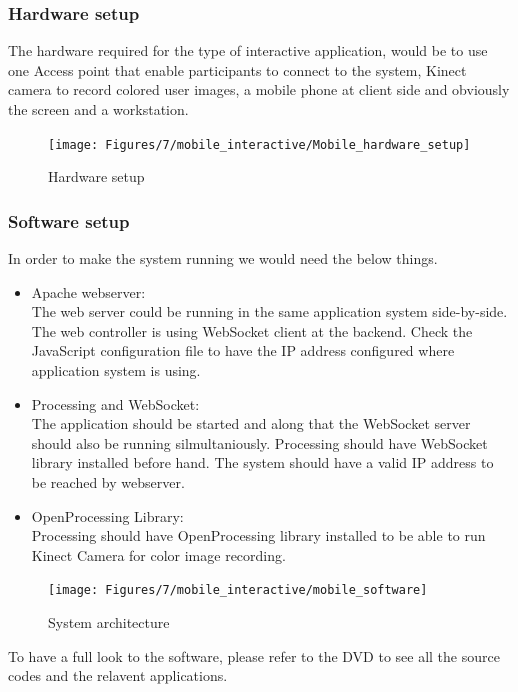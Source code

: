 \iffalse

\subsubsection{Hardware setup}
The hardware required for the type of interactive application, would be to use one Access point that enable participants to connect to the system, Kinect camera to record colored user images, a mobile phone at client side and obviously the screen and a workstation.


\begin{figure}[H]
    \centering
    \texttt{[image: Figures/7/mobile\_interactive/Mobile\_hardware\_setup]}
    \caption{Hardware setup}%
    \label{fig:mobile_hardware_setup}%
\end{figure}


\subsubsection{Software setup}
In order to make the system running we would need the below things.
\begin{itemize}
\item Apache webserver:\\
The web server could be running in the same application system side-by-side. The web controller is using WebSocket client at the backend. Check the JavaScript configuration
file to have the IP address configured where application system is using.
\item Processing and WebSocket:\\
The application should be started and along that the WebSocket server should also be running silmultaniously. Processing should have WebSocket library installed before hand. The system should have a valid IP address to be reached by webserver.
\item OpenProcessing Library:\\
Processing should have OpenProcessing library installed to be able to run Kinect Camera for color image recording.
\end{itemize}


\begin{figure}[H]
    \centering
    \texttt{[image: Figures/7/mobile\_interactive/mobile\_software]}
    \caption{System architecture}%
    \label{fig:mobile_software_setup}%
\end{figure}

To have a full look to the software, please refer to the DVD to see all the source codes and the relavent applications.


